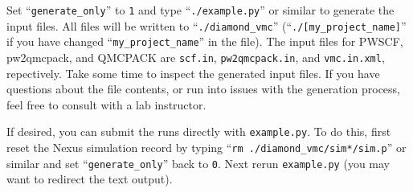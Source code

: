 %

Set ``\texttt{generate\_only}'' to \texttt{1} and type ``\texttt{./example.py}'' or similar to generate the input files.  All files will be written to ``\texttt{./diamond\_vmc}'' (``\texttt{./[my\_project\_name]}'' if you have changed ``\texttt{my\_project\_name}'' in the file).  The input files for PWSCF, pw2qmcpack, and QMCPACK are \texttt{scf.in}, \texttt{pw2qmcpack.in}, and \texttt{vmc.in.xml}, repectively.  Take some time to inspect the generated input files.  If you have questions about the file contents, or run into issues with the generation process, feel free to consult with a lab instructor.  

If desired, you can submit the runs directly with \texttt{example.py}.  To do this, first reset the Nexus simulation record by typing ``\texttt{rm ./diamond\_vmc/sim*/sim.p}'' or similar and set ``\texttt{generate\_only}'' back to \texttt{0}.  Next rerun \texttt{example.py}  (you may want to redirect the text output).  

